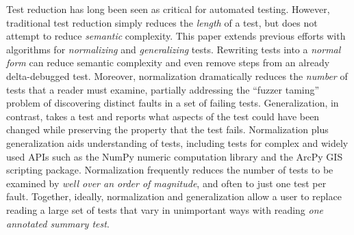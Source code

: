 Test reduction has long been seen as critical for automated testing.  However, traditional test reduction simply reduces the \emph{length} of a test, but does not attempt to reduce \emph{semantic} complexity.  This paper extends previous efforts with algorithms for \emph{normalizing} and \emph{generalizing} tests.  Rewriting tests into a \emph{normal form} can reduce semantic complexity and even remove steps from an already delta-debugged test.  Moreover, normalization dramatically reduces the \emph{number} of tests that a reader must examine, partially addressing the ``fuzzer taming'' problem of discovering distinct faults in a set of failing tests.  Generalization, in contrast, takes a test and reports what aspects of the test could have been changed while preserving the property that the test fails.  Normalization plus generalization aids understanding of tests, including tests for complex and widely used APIs such as the NumPy numeric computation library and the ArcPy GIS scripting package.  Normalization frequently reduces the number of tests to be examined by \emph{well over an order of magnitude}, and often to just one test per fault.  Together, ideally, normalization and generalization allow a user to replace reading a large set of tests that vary in unimportant ways with reading \emph{one annotated summary test}.